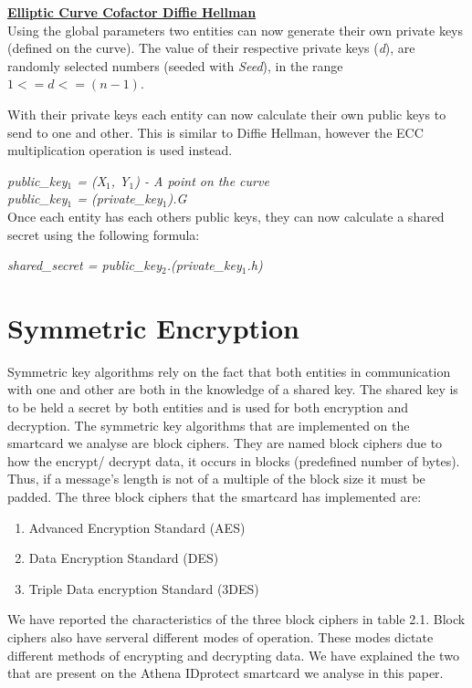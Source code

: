 \documentclass[bsc,frontabs,twoside,singlespacing,parskip,deptreport]{infthesis}     %
\begin{document}
\underline{\textbf{Elliptic Curve Cofactor Diffie Hellman}}\\

Using the global parameters two entities can now generate their own private keys (defined on the curve). The value of their respective private keys (\textit{d}), are randomly selected numbers (seeded with \textit{Seed}), in the range $ 1 <= d <= (n-1)$.

With their private keys each entity can now calculate their own public keys to send to one and other. This is similar to Diffie Hellman, however the ECC multiplication operation is used instead.

\textit{public\_key$_1$ = (X$_1$, Y$_1$) - A point on the curve}\\
\textit{public\_key$_1$ = (private\_key$_1$).G}\\

Once each entity has each others public keys, they can now calculate a shared secret using the following formula:

\begin{center}
\textit{shared\_secret = public\_key$_2$.(private\_key$_1$.h)}
\end{center}


\section{Symmetric Encryption}
Symmetric key algorithms rely on the fact that both entities in communication with one and other are both in the knowledge of a shared key. The shared key is to be held a secret by both entities and is used for both encryption and decryption. The symmetric key algorithms that are implemented on the smartcard we analyse are block ciphers. They are named block ciphers due to how the encrypt/ decrypt data, it occurs in blocks (predefined number of bytes). Thus, if a message's length is not of a multiple of the block size it must be padded. The three block ciphers that the smartcard has implemented are:
\begin{enumerate}
\item Advanced Encryption Standard (AES)
\item Data Encryption Standard (DES)
\item Triple Data encryption Standard (3DES)\\
\end{enumerate}

We have reported the characteristics of the three block ciphers in table 2.1. Block ciphers also have serveral different modes of operation. These modes dictate different methods of encrypting and decrypting data. We have explained the two that are present on the Athena IDprotect smartcard we analyse in this paper.
\end{document}
